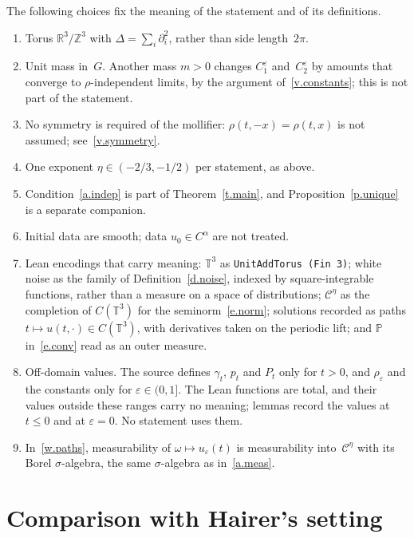 \documentclass[11pt,letterpaper]{article}
\numberwithin{equation}{section}
\theoremstyle{plain}
\theoremstyle{definition}
\theoremstyle{remark}
\newcommand{\R}{\mathbb{R}}
\newcommand{\Z}{\mathbb{Z}}
\newcommand{\T}{\mathbb{T}^3}
\newcommand{\Prob}{\mathbb{P}}
\newcommand{\Cs}{\mathcal{C}}
\newcommand{\nf}[2]{#1/#2}
\newcommand{\1}{\mathbf{1}}
\begin{document}
The following choices fix the meaning of the statement and of its definitions.
\begin{enumerate}[label=\textup{(D\arabic*)}]
\item Torus $\R^3/\Z^3$ with $\Delta=\sum_i\partial_i^2$, rather than side length~$2\pi$.
\item \label{c.mass} Unit mass in~$G$. Another mass $m>0$ changes $C_1^\varepsilon$ and~$C_2^\varepsilon$ by amounts that converge to $\rho$-independent limits, by the argument of~\ref{v.constants}; this is not part of the statement.
\item \label{c.symmetry} No symmetry is required of the mollifier: $\rho(t,-x)=\rho(t,x)$ is not assumed; see~\ref{v.symmetry}.
\item One exponent $\eta\in(-\nf{2}{3},-\nf{1}{2})$ per statement, as above.
\item Condition~\ref{a.indep} is part of Theorem~\ref{t.main}, and Proposition~\ref{p.unique} is a separate companion.
\item Initial data are smooth; data $u_0\in C^\alpha$ are not treated.
\item \label{c.encodings} Lean encodings that carry meaning: $\T$ as \texttt{UnitAddTorus (Fin 3)}; white noise as the family of Definition~\ref{d.noise}, indexed by square-integrable functions, rather than a measure on a space of distributions; $\Cs^\eta$ as the completion of $C(\T)$ for the seminorm~\eqref{e.norm}; solutions recorded as paths $t\mapsto u(t,\cdot)\in C(\T)$, with derivatives taken on the periodic lift; and $\Prob$ in~\eqref{e.conv} read as an outer measure.
\item Off-domain values. The source defines $\gamma_t$, $p_t$ and $P_t$ only for $t>0$, and $\rho_\varepsilon$ and the constants only for $\varepsilon\in(0,1]$. The Lean functions are total, and their values outside these ranges carry no meaning; lemmas record the values at $t\le0$ and at $\varepsilon=0$. No statement uses them.
\item In~\ref{w.paths}, measurability of $\omega\mapsto u_\varepsilon(t)$ is measurability into~$\Cs^\eta$ with its Borel $\sigma$-algebra, the same $\sigma$-algebra as in~\ref{a.meas}.
\end{enumerate}


\section{Comparison with Hairer's setting}
\label{s.verification}
\end{document}
